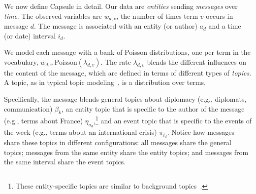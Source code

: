 

We now define Capsule in detail. Our data are \textit{entities}
sending \textit{messages} over \textit{time}. The observed variables
are $w_{d,v}$, the number of times term $v$ occurs in message $d$. The
message is associated with an entity (or author) $a_d$ and a time (or
date) interval $i_d$.

We model each message with a bank of Poisson distributions, one per
term in the vocabulary, $w_{d,v} ~ \textrm{Poisson}(\lambda_{d,v})$.
The rate $\lambda_{d,v}$ blends the different influences on the
content of the message, which are defined in terms of different types
of \textit{topics}. A topic, as in typical topic modeling~\cite{Blei:2003}, is
a distribution over terms.

Specifically, the message blends general topics about diplomacy (e.g.,
diplomats, communication) $\beta_k$, an entity topic that is specific
to the author of the message (e.g., terms about France) $\eta_{a_d}$,\footnote{These entity-specific topics are similar to background topics~\cite{paul2012model}.}
and an event topic that is specific to the events of the week (e.g.,
terms about an international crisis) $\pi_{i_d}$. Notice how messages
share these topics in different configurations: all messages share the
general topics; messages from the same entity share the entity topics;
and messages from the same interval share the event topics.

